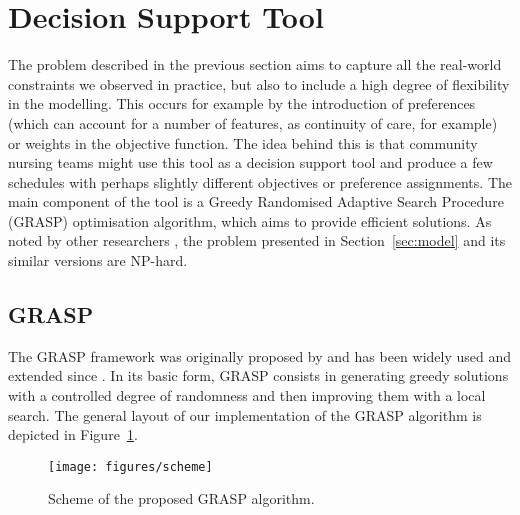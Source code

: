 \documentclass[a4paper,11pt,authoryear]{elsarticle}
\begin{document}

\section{Decision Support Tool}
\label{sec:dst}
\noindent The problem described in the previous section aims to capture all the real-world constraints we observed in practice, but also to include a high degree of flexibility in the modelling. This occurs for example by the introduction of preferences (which can account for a number of features, as continuity of care, for example) or weights in the objective function. The idea behind this is that community nursing teams might use this tool as a decision support tool and produce a few schedules with perhaps slightly different objectives or preference assignments. The main component of the tool is a Greedy Randomised Adaptive Search Procedure (GRASP) optimisation algorithm, which aims to provide efficient solutions. As noted by other researchers \cite[e.g.][]{bertels2006, rasmussen2012, mankowska2014}, the problem presented in Section~\ref{sec:model} and its similar versions are NP-hard.

\subsection{GRASP}
\label{sub:grasp}
\noindent The GRASP framework was originally proposed by \cite{feo1989} and has been widely used and extended since \citep{resende2016}. In its basic form, GRASP consists in generating greedy solutions with a controlled degree of randomness and then improving them with a local search. The general layout of our implementation of the GRASP algorithm is depicted in Figure~\ref{fig:graspdiagram}.

\begin{figure}[htb!]
    \centering
    \texttt{[image: figures/scheme]}
    \caption{Scheme of the proposed GRASP algorithm.}
    \label{fig:graspdiagram}
\end{figure}
\end{document}
